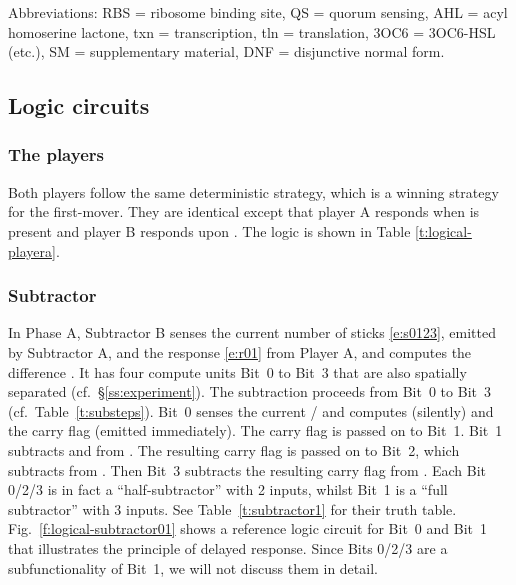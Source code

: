 \documentclass[12pt,notitlepage]{article}
\newcommand{\ra}[1]{{\color{Blue}#1}}
\begin{document}
%
%

Abbreviations:
RBS = ribosome binding site,
QS = quorum sensing,
AHL = acyl homoserine lactone,
txn = transcription,
tln = translation,
{3OC6} = {3OC6}{-}HSL (etc.),
SM = supplementary material,
DNF = disjunctive normal form.


\subsection{Logic circuits}


\subsubsection*{The players} \label{ss:players}

Both players
follow the same deterministic strategy,
which is a winning strategy for the first-mover.
%
They are identical except
that player A responds when  is present
and player B responds upon .
%
The logic is shown in Table \ref{t:logical-playera}.


\subsubsection*{Subtractor} \label{ss:sub}


In Phase A,
Subtractor B 
senses the current number of sticks \eqref{e:s0123},
emitted by Subtractor A,
and 
the response \eqref{e:r01} from Player A,
and
computes the difference .
%
It has four compute units Bit~0 to Bit~3
that are also
spatially separated (cf.~\S\ref{ss:experiment}). 
%
The subtraction proceeds from Bit~0 to Bit~3
(cf.~Table~\ref{t:substeps}).
%
Bit~0 senses the current /
and computes  (silently)
and the carry flag  (emitted immediately).
%
The carry flag is passed on to Bit~1.
%
Bit~1 subtracts  and  from . 
%
The resulting carry flag  
is passed on to Bit~2, 
which subtracts  from .
%
Then Bit~3 subtracts the resulting carry flag
 from .
%
Each Bit 0/2/3
is in fact a ``half-subtractor'' with 2 inputs,
whilst
Bit~1 is a ``full subtractor'' with 3 inputs.
%
%
%
See
Table~\ref{t:subtractor1}
for their truth table.
%
Fig.~\ref{f:logical-subtractor01}
shows a reference logic circuit 
for Bit~0 and Bit~1
that illustrates the principle of delayed response.
%
%
%
\ra{
Since
Bits 0/2/3 
are a subfunctionality of Bit~1,
we will not discuss them in detail.
}
\end{document}
